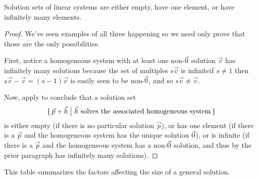 \begin{corollary}
Solution sets of linear systems are either empty, have one element, or
have infinitely many elements.
\end{corollary}

\begin{proof}
We've seen examples of all three happening so we need only prove
that those are the only possibilities.

First, notice a homogeneous system with
at least one  non-\( \vec{0} \) solution $\vec{v}$ has infinitely many
solutions because the set of multiples $s\vec{v}$
is infinite\Dash if $s\neq 1$ then $s\vec{v}-\vec{v}=(s-1)\vec{v}$ is
easily seen to be non-$\vec{0}$, and so $s\vec{v}\neq \vec{v}$.

Now, apply  to conclude that a solution set
\begin{equation*}
  \mbox{$\{\,\vec{p}+\vec{h}\bigm|
    \text{\( \vec{h} \) solves the associated homogeneous system}\,\}$}
\end{equation*}
is either empty (if there is no particular solution \( \vec{p} \)),
or has one element (if there is a \( \vec{p} \) and the homogeneous system
has the unique solution \( \vec{0} \)), or is infinite (if there is a
\( \vec{p} \) and the homogeneous system has a non-$\vec{0}$ solution,
and thus by the prior paragraph has infinitely many solutions).
\end{proof}

This table summarizes the factors affecting the size of a
general solution.

